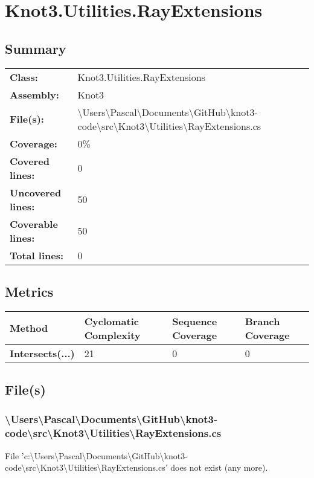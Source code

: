 \documentclass[a4paper,10pt]{article}
\begin{document}
\section{Knot3.Utilities.RayExtensions}
\subsection{Summary}
\begin{longtable}[l]{ll}
\textbf{Class:} & Knot3.Utilities.RayExtensions\\
\textbf{Assembly:} & Knot3\\
\textbf{File(s):} & \begin{minipage}[t]{12cm}{\textbackslash Users\textbackslash Pascal\textbackslash Documents\textbackslash GitHub\textbackslash knot3-code\textbackslash src\textbackslash Knot3\textbackslash Utilities\textbackslash RayExtensions.cs}\end{minipage} \\
\textbf{Coverage:} & 0\%\\
\textbf{Covered lines:} & 0\\
\textbf{Uncovered lines:} & 50\\
\textbf{Coverable lines:} & 50\\
\textbf{Total lines:} & 0\\
\end{longtable}
\subsection{Metrics}
\begin{longtable}[l]{|l|l|l|l|}
\hline
\textbf{Method} & \textbf{Cyclomatic Complexity} & \textbf{Sequence Coverage} & \textbf{Branch Coverage}\\
\hline
\textbf{Intersects(...)} & 21 & 0 & 0\\
\hline
\end{longtable}
\subsection{File(s)}
\subsubsection{\textbackslash Users\textbackslash Pascal\textbackslash Documents\textbackslash GitHub\textbackslash knot3-code\textbackslash src\textbackslash Knot3\textbackslash Utilities\textbackslash RayExtensions.cs}
 File 'c:\textbackslash Users\textbackslash Pascal\textbackslash Documents\textbackslash GitHub\textbackslash knot3-code\textbackslash src\textbackslash Knot3\textbackslash Utilities\textbackslash RayExtensions.cs' does not exist (any more).
\newpage
\end{document}
